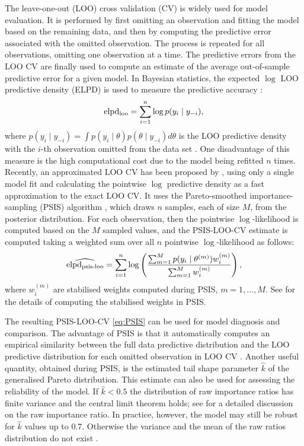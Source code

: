 \documentclass[a4paper]{article}   	%
\newcommand{\elpd}{elpd\textsubscript{loo}}
\newcommand{\psis}{elpd\textsubscript{psis-loo}}
\begin{document}
	The leave-one-out (LOO) cross validation (CV) is widely used for model evaluation. It is performed by first omitting an observation and fitting the model based on the remaining data, and then by computing the predictive error associated with the omitted observation. The process is repeated for all observations, omitting one observation at a time. The predictive errors from the LOO CV are finally used to compute an estimate of the average out-of-sample predictive error for a given model. In Bayesian statistics, the expected $\log$ LOO predictive density (ELPD) is used to measure the predictive accuracy : 
	\begin{equation}\label{eq:elpd}
		\mbox{\elpd} = \sum_{i=1}^{n}\log p(y_i\mid y_{-i}),
	\end{equation}
	where $p(y_i \mid y_{-i}) = \int p(y_i \mid \theta)p(\theta \mid y_{-i})d\theta$ is the LOO predictive density with the $i$-th observation omitted from the data set \parencite{Vehtari2017Practical}. One disadvantage of this measure is the high computational cost due to the model being refitted $n$ times. Recently, an approximated LOO CV has been proposed by \textcite{Burkner2021Efficient}, using only a single model fit and calculating the pointwise $\log$ predictive density as a fast approximation to the exact LOO CV. It uses the Pareto-smoothed importance-sampling (PSIS) algorithm \parencite{Vehtari2017Practical}, which draws $n$ samples, each of size $M$, from the posterior distribution. For each observation, then the pointwise $\log$-likelihood is computed based on the $M$ sampled values, and  the PSIS-LOO-CV estimate is computed taking a weighted sum over all $n$ pointwise $\log$-likelihood as follows:
	\begin{equation}\label{eq:PSIS}
		\widehat{\mbox{\psis}} = \sum_{i=1}^n\log\left(  \frac{ \sum_{m=1}^{M} p(y_i\mid \theta^{(m)})w_i^{(m)} }{ \sum_{m=1}^{M}w_i^{(m)} }\right), 
	\end{equation}
	where $w_i^{(m)}$ are stabilised weights computed during PSIS, $m = 1, \ldots, M$. See \textcite{Vehtari2017Practical} for the details of computing the stabilised weights in PSIS.
	
	
	
	The resulting PSIS-LOO-CV \eqref{eq:PSIS} can be used for model diagnosis and comparison. The advantage of PSIS is that it automatically computes an empirical similarity between the full data predictive distribution and the LOO predictive distribution for each omitted observation in LOO CV \parencite{gabry2019Visualization}. Another useful quantity, obtained during PSIS, is the estimated tail shape parameter $\hat{k}$ of the generalised Pareto distribution. This estimate can also be used for assessing the reliability of the model. If $\hat{k}<0.5$ the distribution of raw importance ratios has finite variance and the central limit theorem holds; see \textcite{Vehtari2017Practical} for a detailed discussion on the raw importance ratio. In practice, however, the model may still be robust for $\hat{k}$ values up to 0.7. Otherwise the variance and the mean of the raw ratios distribution do not exist \parencite{Vehtari2017Practical}. 
	
\end{document}
